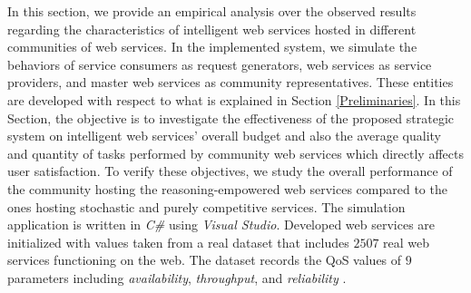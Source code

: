 \documentclass[fleqn]{singlecol-new}
\begin{document}
In this section, we provide an empirical analysis over the
observed results regarding the characteristics of intelligent web
services hosted in different communities of web services. In the
implemented system, we simulate the behaviors of service consumers
as request generators, web services as service providers, and
master web services as community representatives. These entities
are developed with respect to what is explained in Section
\ref{Preliminaries}. In this Section, the objective is to investigate the
effectiveness of the proposed strategic system on intelligent
web services' overall budget and also the average quality and quantity of tasks performed by 
community web services which directly affects user satisfaction. 
To verify these objectives, we study the overall performance of the community hosting the
reasoning-empowered web services compared to the ones hosting
stochastic and purely competitive services. The simulation
application is written in \textit{C\#} using \textit{Visual Studio}. 
Developed web services are initialized with values taken
from a real dataset that includes $2507$ real web services
functioning on the web. The dataset records the QoS values of $9$
parameters including \textit{availability}, \textit{throughput},
and
\textit{reliability} \cite{Almasri}.  %
\end{document}
